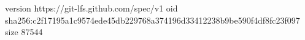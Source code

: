 version https://git-lfs.github.com/spec/v1
oid sha256:c2f17195a1c9574ede45db229768a374196d33412238b9be590f4df8fc23f097
size 87544
